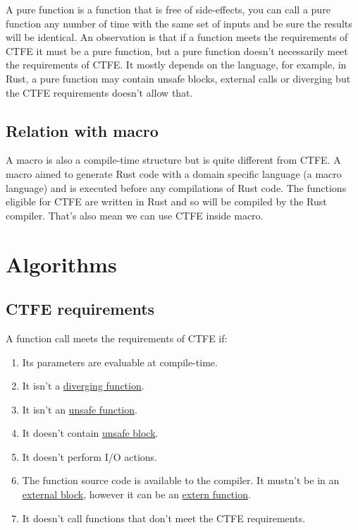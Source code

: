 \documentclass[a4paper,11pt]{article}
\begin{document}
A pure function is a function that is free of side-effects, you can call a pure function any number of time with the same set of inputs and be sure the results will be identical. An observation is that if a function meets the requirements of CTFE it must be a pure function, but a pure function doesn't necessarily meet the requirements of CTFE. It mostly depends on the language, for example, in Rust, a pure function may contain unsafe blocks, external calls or diverging but the CTFE requirements doesn't allow that.

\subsection{Relation with macro}
\label{relation-macro}

A macro is also a compile-time structure but is quite different from CTFE. A macro aimed to generate Rust code with a domain specific language (a macro language) and is executed before any compilations of Rust code. The functions eligible for CTFE are written in Rust and so will be compiled by the Rust compiler. That's also mean we can use CTFE inside macro.

\section{Algorithms}

\subsection{CTFE requirements}
\label{ctfe-requirements}

A function call meets the requirements of CTFE if:

\begin{enumerate}
\item Its parameters are evaluable at compile-time.
\item It isn't a \href{http://static.rust-lang.org/doc/master/rust.html#diverging-functions}{diverging function}.
\item It isn't an \href{http://static.rust-lang.org/doc/master/rust.html#unsafe-functions}{unsafe function}.
\item It doesn't contain \href{http://static.rust-lang.org/doc/master/rust.html#unsafe-blocks}{unsafe block}.
\item It doesn't perform I/O actions.
\item The function source code is available to the compiler. It mustn't be in an \href{http://static.rust-lang.org/doc/master/rust.html#external-blocks}{external block}, however it can be an \href{http://static.rust-lang.org/doc/master/rust.html#extern-functions}{extern function}.
\item It doesn't call functions that don't meet the CTFE requirements.
\end{enumerate}
\end{document}
